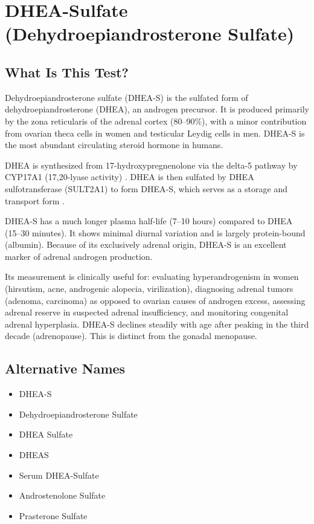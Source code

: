 \chapter{DHEA-Sulfate (Dehydroepiandrosterone Sulfate)}

\section*{What Is This Test?}
Dehydroepiandrosterone sulfate (DHEA-S) is the sulfated form of dehydroepiandrosterone (DHEA), an androgen precursor. It is produced primarily by the zona reticularis of the adrenal cortex (80--90\%), with a minor contribution from ovarian theca cells in women and testicular Leydig cells in men. DHEA-S is the most abundant circulating steroid hormone in humans.

DHEA is synthesized from 17-hydroxypregnenolone via the delta-5 pathway by CYP17A1 (17,20-lyase activity) \cite{auchus2018androgen}. DHEA is then sulfated by DHEA sulfotransferase (SULT2A1) to form DHEA-S, which serves as a storage and transport form \cite{rege2018dhea}.

DHEA-S has a much longer plasma half-life (7--10 hours) compared to DHEA (15--30 minutes). It shows minimal diurnal variation and is largely protein-bound (albumin). Because of its exclusively adrenal origin, DHEA-S is an excellent marker of adrenal androgen production.

Its measurement is clinically useful for: evaluating hyperandrogenism in women (hirsutism, acne, androgenic alopecia, virilization), diagnosing adrenal tumors (adenoma, carcinoma) as opposed to ovarian causes of androgen excess, assessing adrenal reserve in suspected adrenal insufficiency, and monitoring congenital adrenal hyperplasia. DHEA-S declines steadily with age after peaking in the third decade (adrenopause). This is distinct from the gonadal menopause.

\section*{Alternative Names}
\begin{itemize}
  \item DHEA-S
  \item Dehydroepiandrosterone Sulfate
  \item DHEA Sulfate
  \item DHEAS
  \item Serum DHEA-Sulfate
  \item Androstenolone Sulfate
  \item Prasterone Sulfate
\end{itemize}
